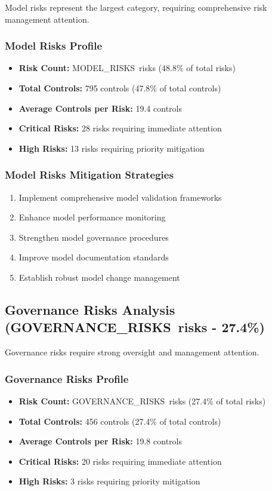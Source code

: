 \documentclass[11pt,a4paper]{article}
\newcommand{\modelrisks}{{{MODEL_RISKS}}}
\newcommand{\governancerisks}{{{GOVERNANCE_RISKS}}}
\begin{document}
Model risks represent the largest category, requiring comprehensive risk management attention.

\subsubsection{Model Risks Profile}
\begin{itemize}
\item \textbf{Risk Count:} \modelrisks\ risks (48.8\% of total risks)
\item \textbf{Total Controls:} 795 controls (47.8\% of total controls)
\item \textbf{Average Controls per Risk:} 19.4 controls
\item \textbf{Critical Risks:} 28 risks requiring immediate attention
\item \textbf{High Risks:} 13 risks requiring priority mitigation
\end{itemize}

\subsubsection{Model Risks Mitigation Strategies}
\begin{enumerate}
\item Implement comprehensive model validation frameworks
\item Enhance model performance monitoring
\item Strengthen model governance procedures
\item Improve model documentation standards
\item Establish robust model change management
\end{enumerate}

\subsection{Governance Risks Analysis (\governancerisks\ risks - 27.4\%)}

Governance risks require strong oversight and management attention.

\subsubsection{Governance Risks Profile}
\begin{itemize}
\item \textbf{Risk Count:} \governancerisks\ risks (27.4\% of total risks)
\item \textbf{Total Controls:} 456 controls (27.4\% of total controls)
\item \textbf{Average Controls per Risk:} 19.8 controls
\item \textbf{Critical Risks:} 20 risks requiring immediate attention
\item \textbf{High Risks:} 3 risks requiring priority mitigation
\end{itemize}
\end{document}
